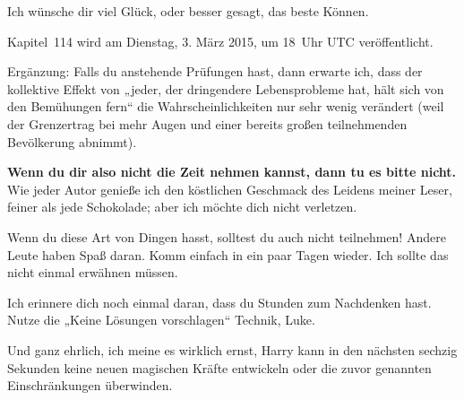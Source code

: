 {%
Ich wünsche dir viel Glück, oder besser gesagt, das beste Können.

Kapitel~114 wird am Dienstag, 3. März 2015, um 18~Uhr UTC veröffentlicht.

Ergänzung:
Falls du anstehende Prüfungen hast, dann erwarte ich, dass der kollektive Effekt von „jeder, der dringendere Lebensprobleme hat, hält sich von den Bemühungen fern“ die Wahrscheinlichkeiten nur sehr wenig verändert (weil der Grenzertrag bei mehr Augen und einer bereits großen teilnehmenden Bevölkerung abnimmt).

\textbf{Wenn du dir also nicht die Zeit nehmen kannst, dann tu es bitte nicht.} Wie jeder Autor genieße ich den köstlichen Geschmack des Leidens meiner Leser, feiner als jede Schokolade; aber ich möchte dich nicht verletzen.

Wenn du diese Art von Dingen hasst, solltest du auch nicht teilnehmen! Andere Leute haben Spaß daran. Komm einfach in ein paar Tagen wieder. Ich sollte das nicht einmal erwähnen müssen.

Ich erinnere dich noch einmal daran, dass du Stunden zum Nachdenken hast. Nutze die „Keine Lösungen vorschlagen“ Technik, Luke.

Und ganz ehrlich, ich meine es wirklich ernst, Harry kann in den nächsten sechzig Sekunden keine neuen magischen Kräfte entwickeln oder die zuvor genannten Einschränkungen überwinden.

\later

}
